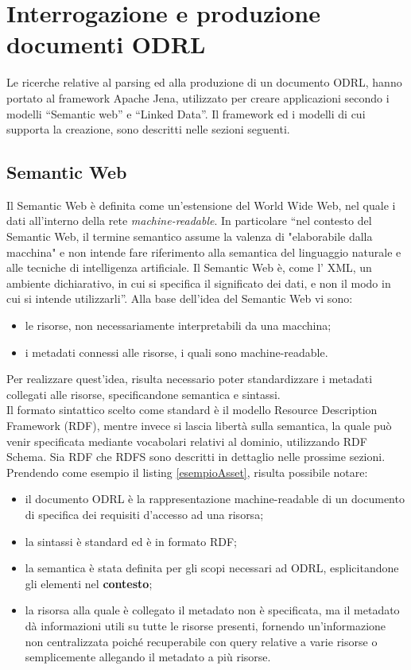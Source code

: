 \documentclass[12pt,a4paper,twoside]{book}
\begin{document}
\section{Interrogazione e produzione documenti ODRL}
Le ricerche relative al parsing ed alla produzione di un documento ODRL, hanno portato al framework Apache Jena\cite{Jena}, utilizzato per creare applicazioni secondo i modelli  ``Semantic web''\cite{SemanticWeb} e  ``Linked Data''. Il framework ed i modelli di cui supporta la creazione, sono descritti nelle sezioni seguenti.
\subsection{Semantic Web}
Il Semantic Web è definita come un'estensione del World Wide Web, nel quale i dati all'interno della rete \textit{machine-readable}. In particolare ``nel contesto del Semantic Web, il termine semantico assume la valenza di
"elaborabile dalla macchina" e non intende fare riferimento alla semantica del 
linguaggio naturale e alle tecniche di intelligenza artificiale. Il Semantic Web è, come l’
XML, un ambiente dichiarativo, in cui si specifica il significato dei dati, e non il modo
in cui si intende utilizzarli''\cite{introSem}. Alla base dell'idea del Semantic Web vi sono:
\begin{itemize}
	\item le risorse, non necessariamente interpretabili da una macchina;
	\item i metadati connessi alle risorse, i quali sono machine-readable.
\end{itemize}
Per realizzare quest'idea, risulta necessario poter standardizzare i metadati collegati alle risorse, specificandone semantica e sintassi.\\
Il formato sintattico scelto come standard è il modello Resource Description Framework (RDF)\cite{RDF}, mentre invece si lascia libertà sulla semantica, la quale può venir specificata mediante vocabolari relativi al dominio, utilizzando RDF Schema\cite{RDFS}. Sia RDF che RDFS sono descritti in dettaglio nelle prossime sezioni.\\
Prendendo come esempio il listing \ref{esempioAsset}, risulta possibile notare:
\begin{itemize}
	\item il documento ODRL è la rappresentazione machine-readable di un documento di specifica dei requisiti d'accesso ad una risorsa;
	\item la sintassi è standard ed è in formato RDF;
	\item la semantica è stata definita per gli scopi necessari ad ODRL, esplicitandone gli elementi nel \textbf{contesto};
	\item la risorsa alla quale è collegato il metadato non è specificata, ma il metadato dà informazioni utili su tutte le risorse presenti, fornendo un'informazione non centralizzata poiché recuperabile con query relative a varie risorse o semplicemente allegando il metadato a più risorse.
\end{itemize}
\end{document}
